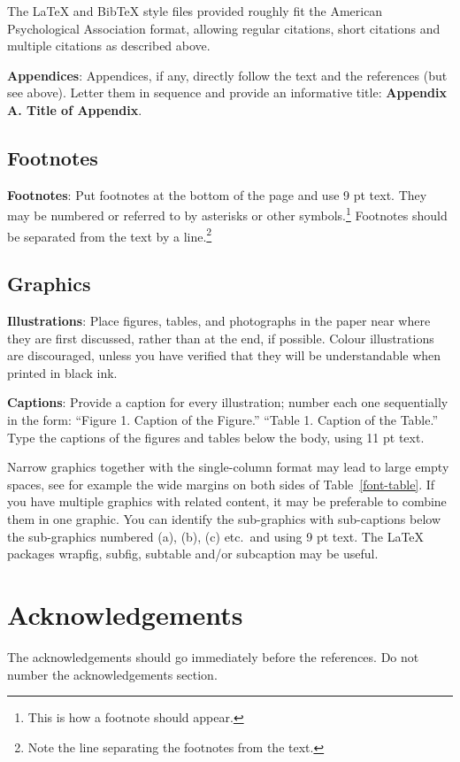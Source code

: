 \documentclass[11pt]{article}
\begin{document}
The \LaTeX{} and Bib\TeX{} style files provided roughly fit the
American Psychological Association format, allowing regular citations,
short citations and multiple citations as described above.

{\bf Appendices}: Appendices, if any, directly follow the text and the
references (but see above).  Letter them in sequence and provide an
informative title: {\bf Appendix A. Title of Appendix}.

\subsection{Footnotes}

{\bf Footnotes}: Put footnotes at the bottom of the page and use 9 pt
text. They may be numbered or referred to by asterisks or other
symbols.\footnote{This is how a footnote should appear.} Footnotes
should be separated from the text by a line.\footnote{Note the line
separating the footnotes from the text.}

\subsection{Graphics}

{\bf Illustrations}: Place figures, tables, and photographs in the
paper near where they are first discussed, rather than at the end, if
possible.
Colour illustrations are discouraged, unless you have verified that
they will be understandable when printed in black ink.

{\bf Captions}: Provide a caption for every illustration; number each one
sequentially in the form:  ``Figure 1. Caption of the Figure.'' ``Table 1.
Caption of the Table.''  Type the captions of the figures and
tables below the body, using 11 pt text.

Narrow graphics together with the single-column format may lead to
large empty spaces,
see for example the wide margins on both sides of Table~\ref{font-table}.
If you have multiple graphics with related content, it may be
preferable to combine them in one graphic.
You can identify the sub-graphics with sub-captions below the
sub-graphics numbered (a), (b), (c) etc.\ and using 9 pt text.
The \LaTeX{} packages wrapfig, subfig, subtable and/or subcaption
may be useful.

\section*{Acknowledgements}

The acknowledgements should go immediately before the references.  Do
not number the acknowledgements section.



\end{document}
